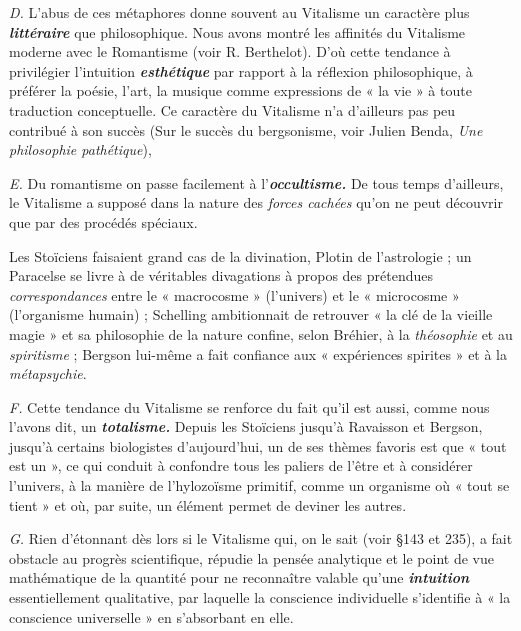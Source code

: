 {\it D.} L'abus de ces métaphores donne souvent au Vitalisme un
caractère plus \textbf{\textit {littéraire}} que philosophique. Nous avons montré les
affinités du Vitalisme moderne avec le Romantisme (voir R. Berthelot).
D’où cette tendance à privilégier l'intuition \textbf{\textit {esthétique}}
par rapport à la réflexion philosophique, à préférer la poésie, l’art,
la musique comme expressions de « la vie » à toute traduction conceptuelle.
Ce caractère du Vitalisme n’a d'ailleurs pas peu contribué à
son succès
{\scriptsize (Sur le succès du bergsonisme, voir Julien Benda, {\it Une philosophie pathétique})},

{\it E.} Du romantisme on passe facilement à l’\textbf{\textit {occultisme.}} De tous
temps d’ailleurs, le Vitalisme a supposé dans la nature des {\it forces
cachées} qu’on ne peut découvrir que par des procédés spéciaux.

Les Stoïciens faisaient grand cas de la divination, Plotin de l’astrologie ;
un Paracelse se livre à de véritables divagations à propos des prétendues
{\it correspondances} entre le « macrocosme » (l’univers) et le « microcosme »
(l'organisme humain) ; Schelling ambitionnait de retrouver « la
clé de la vieille magie » et sa philosophie de la nature confine, selon Bréhier,
à la {\it théosophie} et au {\it spiritisme} ; Bergson lui-même a fait confiance aux
« expériences spirites » et à la {\it métapsychie}.

{\it F.} Cette tendance du Vitalisme se renforce du fait qu’il est aussi,
comme nous l’avons dit, un \textbf{\textit {totalisme.}} Depuis les Stoïciens jusqu’à
Ravaisson et Bergson, jusqu’à certains biologistes d’aujourd’hui,
un de ses thèmes favoris est que « tout est un », ce qui conduit à
confondre tous les paliers de l'être et à considérer l’univers, à la
manière de l’hylozoïsme primitif, comme un organisme où « tout se
tient » et où, par suite, un élément permet de deviner les autres.

{\it G.} Rien d'étonnant dès lors si le Vitalisme qui, on le sait (voir
\S 143 et 235), a fait obstacle au progrès scientifique, répudie la pensée
analytique et le point de vue mathématique de la quantité pour ne
reconnaître valable qu’une \textbf{\textit {intuition}} essentiellement qualitative,
par laquelle la conscience individuelle s’identifie à « la conscience
universelle » en s’absorbant en elle.

